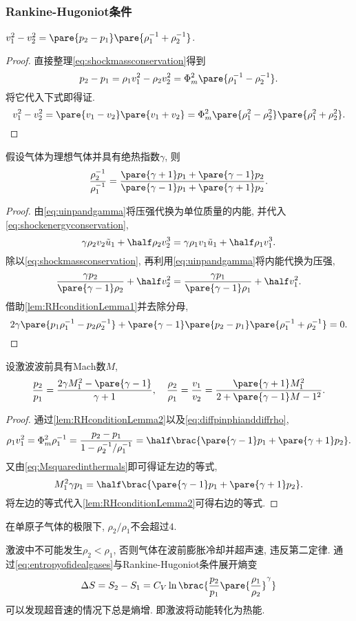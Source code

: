\documentclass[../Thermal.tex]{subfiles}
\begin{document}
\subsubsection{Rankine-Hugoniot条件}
\begin{lemma}
\label{lem:RHconditionLemma1}
$v_1^2 - v_2^2 = \pare{p_2 - p_1}\pare{\rho_1^{-1} + \rho_2^{-1}}$.
\end{lemma}
\begin{proof}
直接整理\eqref{eq:shockmassconservation}得到
\begin{equation}
\label{eq:diffpinphianddiffrho}
p_2 - p_1 = \rho_1 v_1^2 - \rho_2 v_2^2 = \Phi_m^2\pare{\rho_1^{-1} - \rho_2^{-1}}.
\end{equation}
将它代入下式即得证.
\[ v_1^2 - v_2^2 = \pare{v_1 - v_2}\pare{v_1 + v_2} = \Phi_m^2\pare{\rho_1^2 - \rho_2^2}\pare{\rho_1^2 + \rho_2^2}.  \qedhere \]
\end{proof}
\begin{lemma}
\label{lem:RHconditionLemma2}
假设气体为理想气体并具有绝热指数$\gamma$, 则
\[ \frac{\rho_2^{-1}}{\rho_1^{-1}} = \frac{\pare{\gamma+1}p_1+\pare{\gamma-1}p_2}{\pare{\gamma-1}p_1+\pare{\gamma+1}p_2}. \]
\end{lemma}
\begin{proof}
由\eqref{eq:uinpandgamma}将压强代换为单位质量的内能, 并代入\eqref{eq:shockenergyconservation},
\[ \gamma\rho_2v_2\tilde{u}_1 + \half\rho_2v_2^3 = \gamma\rho_1v_1\tilde{u}_1 + \half\rho_1v_1^3. \]
除以\eqref{eq:shockmassconservation}, 再利用\eqref{eq:uinpandgamma}将内能代换为压强,
\[ \frac{\gamma p_2}{\pare{\gamma - 1}\rho_2} + \half v_2^2 = \frac{\gamma p_1}{\pare{\gamma - 1}\rho_1} + \half v_1^2. \]
借助\cref{lem:RHconditionLemma1}并去除分母,
\[ 2\gamma\pare{p_1\rho_1^{-1} - p_2\rho_2^{-1}} + \pare{\gamma - 1}\pare{p_2 - p_1}\pare{\rho_1^{-1} + \rho_2^{-1}} = 0. \qedhere \]
\end{proof}
\begin{finale}
\begin{theorem}
设激波波前具有Mach数$M$,
\[ \frac{p_2}{p_1} = \frac{2\gamma M_1^2 - \pare{\gamma - 1}}{\gamma + 1},\quad \frac{\rho_2}{\rho_1} = \frac{v_1}{v_2} = \frac{\pare{\gamma + 1}M_1^2}{2+\pare{\gamma - 1}M-1^2}. \]
\end{theorem}
\end{finale}
\begin{proof}
通过\cref{lem:RHconditionLemma2}以及\eqref{eq:diffpinphianddiffrho},
\[ \rho_1 v_1^2 = \Phi_m^2\rho_1^{-1} = \frac{p_2 - p_1}{1 - \rho_2^{-1}/\rho_1^{-1}} = \half \brac{\pare{\gamma - 1}p_1 + \pare{\gamma + 1}p_2}. \]
又由\eqref{eq:Msquaredinthermals}即可得证左边的等式,
\[ M_1^2 \gamma p_1 = \half \brac{\pare{\gamma - 1}p_1 + \pare{\gamma + 1}p_2}. \]
将左边的等式代入\cref{lem:RHconditionLemma2}可得右边的等式.
\end{proof}
\begin{ex}
在单原子气体的极限下, $\rho_2/\rho_1$不会超过$4$.
\end{ex}
激波中不可能发生$\rho_2<\rho_1$, 否则气体在波前膨胀冷却并超声速, 违反第二定律. 通过\eqref{eq:entropyofidealgases}与Rankine-Hugoniot条件展开熵变
\[ \Delta S = S_2 - S_1 = C_V \ln\brac{\frac{p_2}{p_1}\pare{\frac{\rho_1}{\rho_2}}^{\gamma}} \]
可以发现超音速的情况下总是熵增. 即激波将动能转化为热能.
\end{document}
